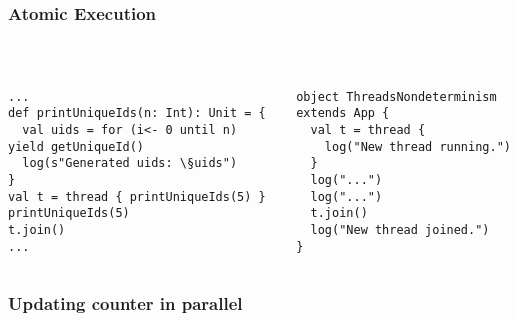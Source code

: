 \documentclass[aspectratio=169]{beamer}
\begin{document}
\begin{frame}[fragile]\frametitle{Atomic Execution}
~\\[-8mm]
\begin{columns}
\begin{column}{0.49\textwidth}
\begin{lstlisting}[emph={printUniqueIds,sleep,log,thread,join}]
...
def printUniqueIds(n: Int): Unit = {
  val uids = for (i<- 0 until n) yield getUniqueId()
  log(s"Generated uids: \§uids")
}
val t = thread { printUniqueIds(5) }
printUniqueIds(5)
t.join()
...
\end{lstlisting}
\end{column}
\begin{column}{0.49\textwidth}
\begin{lstlisting}[emph={sleep,log,thread,join}]
object ThreadsNondeterminism extends App {
  val t = thread {
    log("New thread running.")
  }
  log("...")
  log("...")
  t.join()
  log("New thread joined.")
}
\end{lstlisting}
\end{column}
\end{columns}
%
\end{frame}

\begin{frame}\frametitle{Updating counter in parallel}
  \centering

  \medskip
  
\end{frame}
\end{document}
